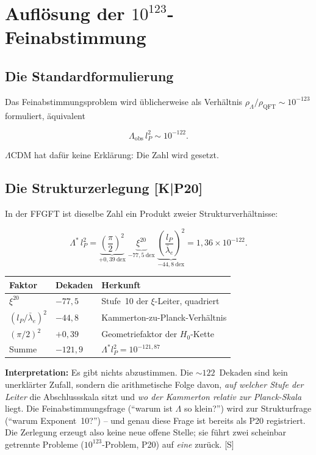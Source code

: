 \documentclass[11pt]{report}
\begin{document}
\chapter{Auflösung der $10^{123}$-Feinabstimmung}

\section{Die Standardformulierung}

Das Feinabstimmungsproblem wird üblicherweise als Verhältnis
$\rho_\Lambda/\rho_\text{QFT} \sim 10^{-123}$ formuliert, äquivalent

\[
  \Lambda_\text{obs}\,l_P^{2} \sim 10^{-122}.
\]

$\Lambda$CDM hat dafür keine Erklärung: Die Zahl wird gesetzt.

\section{Die Strukturzerlegung [K|P20]}

In der FFGFT ist dieselbe Zahl ein Produkt zweier Strukturverhältnisse:

\begin{equation}
  \Lambda^{*}\,l_P^{2}
  = \underbrace{\left(\frac{\pi}{2}\right)^{2}}_{+0{,}39~\text{dex}}
    \;\underbrace{\xi^{20}}_{-77{,}5~\text{dex}}
    \;\underbrace{\left(\frac{l_P}{\bar\lambda_e}\right)^{2}}_{-44{,}8~\text{dex}}
  = 1{,}36\times10^{-122}.
  \label{eq:zerlegung}
\end{equation}

\begin{center}
\begin{tabular}{lll}
\toprule
Faktor & Dekaden & Herkunft \\
\midrule
$\xi^{20}$ & $-77{,}5$ & Stufe~10 der $\xi$-Leiter, quadriert \\
$(l_P/\bar\lambda_e)^2$ & $-44{,}8$ & Kammerton-zu-Planck-Verhältnis \\
$(\pi/2)^2$ & $+0{,}39$ & Geometriefaktor der $H_0$-Kette \\
\midrule
Summe & $-121{,}9$ & $\Lambda^{*}l_P^2 = 10^{-121{,}87}$ \\
\bottomrule
\end{tabular}
\end{center}

\textbf{Interpretation:} Es gibt nichts abzustimmen. Die
$\sim\!122$~Dekaden sind kein unerklärter Zufall, sondern die
arithmetische Folge davon, \emph{auf welcher Stufe der Leiter} die
Abschlussskala sitzt und \emph{wo der Kammerton relativ zur
Planck-Skala} liegt. Die Feinabstimmungsfrage
(\enquote{warum ist $\Lambda$ so klein?}) wird zur Strukturfrage
(\enquote{warum Exponent~10?}) -- und genau diese Frage ist bereits
als P20 registriert. Die Zerlegung erzeugt also keine neue offene
Stelle; sie führt zwei scheinbar getrennte Probleme
($10^{123}$-Problem, P20) auf \emph{eine} zurück. [S]
\end{document}
